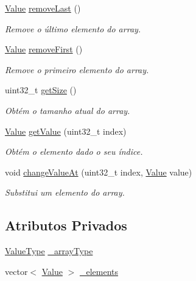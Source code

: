 \begin{DoxyCompactItemize}
\hyperlink{structValue}{Value} \hyperlink{classArrayObject_a5235153943129699da298a3ecc7cfa14}{remove\+Last} ()
\begin{DoxyCompactList}\small\item\em Remove o último elemento do array. \end{DoxyCompactList}\item 
\hyperlink{structValue}{Value} \hyperlink{classArrayObject_aaf722b5670d62f09370aeab36ebe0dfd}{remove\+First} ()
\begin{DoxyCompactList}\small\item\em Remove o primeiro elemento do array. \end{DoxyCompactList}\item 
uint32\+\_\+t \hyperlink{classArrayObject_af43b8f4106c2f15def7fecd3e3f6b239}{get\+Size} ()
\begin{DoxyCompactList}\small\item\em Obtém o tamanho atual do array. \end{DoxyCompactList}\item 
\hyperlink{structValue}{Value} \hyperlink{classArrayObject_a468341ed2c683c3152a0ea58b2094c0f}{get\+Value} (uint32\+\_\+t index)
\begin{DoxyCompactList}\small\item\em Obtém o elemento dado o seu índice. \end{DoxyCompactList}\item 
void \hyperlink{classArrayObject_a20e1735b3bc9db6c9bd219d70355f160}{change\+Value\+At} (uint32\+\_\+t index, \hyperlink{structValue}{Value} value)
\begin{DoxyCompactList}\small\item\em Substitui um elemento do array. \end{DoxyCompactList}\end{DoxyCompactItemize}
\subsection*{Atributos Privados}
\begin{DoxyCompactItemize}
\item 
\hyperlink{BasicTypes_8h_ad9971b6ef33e02ba2c75d19c1d2518a1}{Value\+Type} \hyperlink{classArrayObject_a83a4c777ec1059f3e85aaa698442f72b}{\+\_\+array\+Type}
\item 
vector$<$ \hyperlink{structValue}{Value} $>$ \hyperlink{classArrayObject_a1d085d50c90613812fdf539472e76b0c}{\+\_\+elements}
\end{DoxyCompactItemize}


